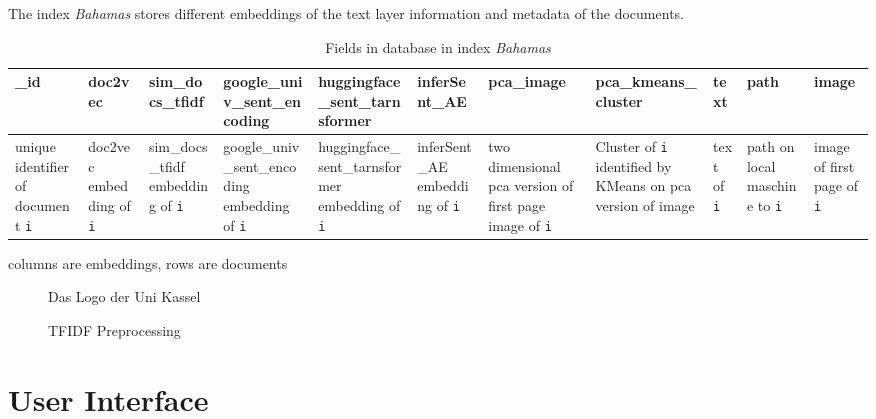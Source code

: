 The index \textit{Bahamas} stores different embeddings of the text layer information and metadata of the documents.

\begin{table}[htp]
    \centering
    \caption{Fields in \databaseName{} database in index \textit{Bahamas}}
    \begin{tabular}{|l|l|l|l|l|l|l|l|l|l|l|}
    \hline
        \_id & doc2vec & sim\_docs\_tfidf & google\_univ\_sent\_encoding & huggingface\_sent\_tarnsformer & inferSent\_AE & pca\_image & pca\_kmeans\_cluster & text & path & image \\
        \hline
        unique identifier of document \texttt{i} & doc2vec embedding of \texttt{i} & sim\_docs\_tfidf embedding of \texttt{i} & google\_univ\_sent\_encoding embedding of \texttt{i} & huggingface\_sent\_tarnsformer embedding of \texttt{i} & inferSent\_AE embedding of \texttt{i} & two dimensional \ac{pca} version of first page image of \texttt{i} & Cluster of \texttt{i} identified by KMeans on \ac{pca} version of image & text of \texttt{i} & path on local maschine to \texttt{i} & image of first page of \texttt{i} \\
        \hline
    \end{tabular}
    \label{tbl:Elasticsearch-fields}
\end{table}






columns are embeddings, rows are documents

\begin{figure}[htp] %
    \centering
    
    \caption{Das Logo der Uni Kassel}
    \label{fig:pdf2db}
\end{figure}

\begin{figure}[htp] %
    \centering
    
    \caption{TFIDF Preprocessing}
    \label{fig:preprocessing}
\end{figure}

\section{User Interface}\label{sec:ui}
